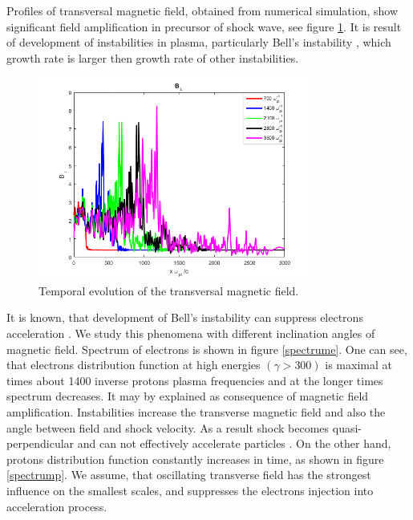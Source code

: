 \documentclass[a4paper]{jpconf}
\begin{document}
	Profiles of transversal magnetic field, obtained from numerical simulation, show significant field amplification in precursor of shock wave, see figure \ref{field}. It is result of development of instabilities in plasma, particularly Bell's instability \cite{Bell04}, which growth rate is larger then growth rate of other instabilities.
	
	\begin{figure}[h!]
		\centering
		\includegraphics[width=0.8\textwidth]{fig/Bnorm.png} 
		\caption{Temporal evolution of the transversal magnetic field.}
		\label{field}
	\end{figure}
	
	It is known, that development of Bell's instability can suppress electrons acceleration \cite{Crumley2019}. We study this phenomena with different inclination angles of magnetic field. Spectrum of electrons is shown in figure \ref{spectrume}. One can see, that electrons distribution function at high energies $(\gamma > 300)$ is maximal at times about 1400 inverse protons plasma frequencies and at the longer times spectrum decreases. It may by explained as consequence of magnetic field amplification. Instabilities increase the transverse magnetic field and also the angle between field and shock velocity. As a result shock becomes quasi-perpendicular and can not effectively accelerate particles \cite{Sironi2011,Romansky18}. On the other hand, protons distribution function constantly increases in time, as shown in figure \ref{spectrump}. We assume, that oscillating transverse field has the strongest influence on the smallest scales, and suppresses the electrons injection into acceleration process.
	
\end{document}
